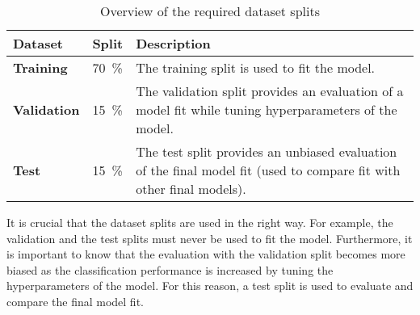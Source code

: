 \begin{table}
  \caption{Overview of the required dataset splits \cite{training_datasets}}
  \label{tab:dataset_splits}
  \centering
  \begin{tabular}{llp{10cm}}
    \toprule
    \textbf{Dataset} & \textbf{Split} & \textbf{Description} \\
    \midrule
    \textbf{Training} & \SI{70}{\percent} & The training split is used to fit the model. \\
    \midrule
    \textbf{Validation} & \SI{15}{\percent} & The validation split provides an evaluation of a model fit while tuning hyperparameters of the model. \\
    \midrule
    \textbf{Test} & \SI{15}{\percent} & The test split provides an unbiased evaluation of the final model fit (used to compare fit with other final models). \\
    \bottomrule
  \end{tabular}
\end{table}

It is crucial that the dataset splits are used in the right way.
For example, the validation and the test splits must never be used to fit the model.
Furthermore, it is important to know that the evaluation with the validation split becomes more biased as the classification performance is increased by tuning the hyperparameters of the model.
For this reason, a test split is used to evaluate and compare the final model fit.

